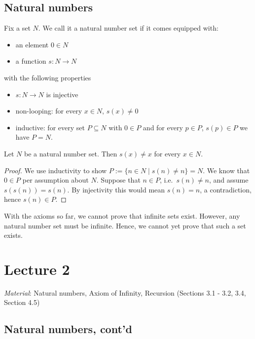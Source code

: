 \documentclass{whrartcl}
\begin{document}
\subsection{Natural numbers}

\begin{definition}
  Fix a set $N$. We call it a natural number set if it comes equipped with:
  \begin{itemize}
  \item an element $0 \in N$
  \item a function $s : N \to N$
  \end{itemize}
  with the following properties
  \begin{itemize}
  \item $s : N \to N$ is injective
  \item non-looping: for every $x \in N$, $s(x) \neq 0$
  \item inductive: for every set $P \subseteq N$ with $0 \in P$ and for every $p \in P$,
    $s(p) \in P$ we have $P = N$.
  \end{itemize}
\end{definition}

\begin{proposition}
  Let $N$ be a natural number set. Then $s(x) \neq x$ for every $x \in N$.
\end{proposition}
\begin{proof}
  We use inductivity to show $P := \{n \in N \mid s(n) \neq n\} = N$. We know
  that $0 \in P$ per assumption about $N$. Suppose that $n \in P$, i.e.\ $s(n) \neq n$, and
  assume $s(s(n)) = s(n)$. By injectivity this would mean $s(n) = n$, a
  contradiction, hence $s(n) \in P$.
\end{proof}

\begin{observation}
  With the axioms so far, we cannot prove that infinite sets exist. However, any
  natural number set must be infinite. Hence, we cannot yet prove that such a
  set exists.
\end{observation}

\newpage
\section{Lecture 2}

\emph{Material}: Natural numbers, Axiom of Infinity, Recursion (Sections 3.1 - 3.2, 3.4, Section 4.5)


\subsection{Natural numbers, cont'd}
\end{document}
